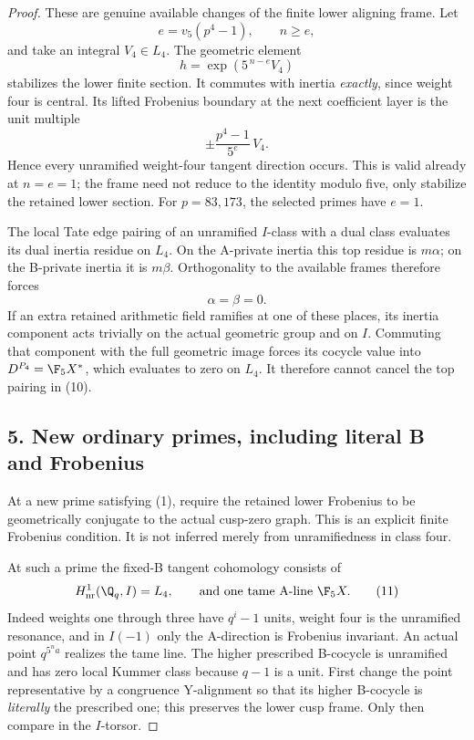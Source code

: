 \begin{proof}
These are genuine available changes of the finite lower aligning frame. Let
\[
 e=v_5(p^4-1),\qquad n\ge e,
\]
and take an integral $V_4\in L_4$. The geometric element
\[
 h=\exp(5^{\,n-e}V_4)
 \tag{8}
\]
stabilizes the lower finite section. It commutes with inertia \emph{exactly}, since weight four is central. Its lifted Frobenius boundary at the next coefficient layer is the unit multiple
\[
 \pm\frac{p^4-1}{5^e}\,V_4.
 \tag{9}
\]
Hence every unramified weight-four tangent direction occurs. This is valid already at $n=e=1$; the frame need not reduce to the identity modulo five, only stabilize the retained lower section. For $p=83,173$, the selected primes have $e=1$.

The local Tate edge pairing of an unramified $I$-class with a dual class evaluates its dual inertia residue on $L_4$. On the A-private inertia this top residue is $m\alpha$; on the B-private inertia it is $m\beta$. Orthogonality to the available frames therefore forces
\[
 \alpha=\beta=0.
 \tag{10}
\]
If an extra retained arithmetic field ramifies at one of these places, its inertia component acts trivially on the actual geometric group and on $I$. Commuting that component with the full geometric image forces its cocycle value into $D^{P_4}=\F_5X^*$, which evaluates to zero on $L_4$. It therefore cannot cancel the top pairing in (10).

\subsection*{5. New ordinary primes, including literal B and Frobenius}
At a new prime satisfying (1), require the retained lower Frobenius to be geometrically conjugate to the actual cusp-zero graph. This is an explicit finite Frobenius condition. It is not inferred merely from unramifiedness in class four.

At such a prime the fixed-B tangent cohomology consists of
\[
 H^1_{\mathrm{nr}}(\Q_q,I)=L_4,
 \qquad\text{and one tame A-line }\F_5X.
 \tag{11}
\]
Indeed weights one through three have $q^i-1$ units, weight four is the unramified resonance, and in $I(-1)$ only the A-direction is Frobenius invariant. An actual point $q^{5^n a}$ realizes the tame line. The higher prescribed B-cocycle is unramified and has zero local Kummer class because $q-1$ is a unit. First change the point representative by a congruence Y-alignment so that its higher B-cocycle is \emph{literally} the prescribed one; this preserves the lower cusp frame. Only then compare in the $I$-torsor.


\end{proof}
